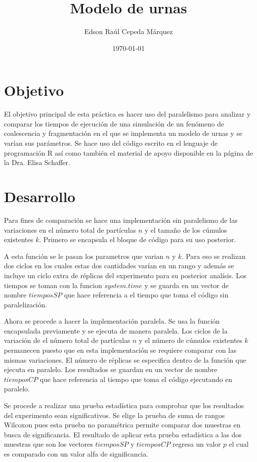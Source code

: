\documentclass{article}
\author{Edson Raúl Cepeda Márquez}
\title{Modelo de urnas}
\date{\today}
\begin{document}
\maketitle

\section{Objetivo}
El objetivo principal de esta práctica es hacer uso del paralelismo para analizar y comparar los tiempos de ejecución de una simulación de un fenómeno de coalescencia y fragmentación en el que se implementa un modelo de urnas y se varían sus parámetros. Se hace uso del código escrito en el lenguaje de programación R \cite{r} así como también el material de apoyo disponible en la página \cite{satu} de la Dra. Elisa Schaffer.

\section{Desarrollo}
Para fines de comparación se hace una implementación sin paralelismo de las variaciones en el número total de partículas $n$ y el tamaño de los cúmulos existentes $k$.
Primero se encapsula el bloque de código para su uso posterior.

A esta función se le pasan los parametros que varian $n$ y $k$.
Para eso se realizan dos ciclos en los cuales estas dos cantidades varían en un rango y además se incluye un ciclo extra de réplicas del experimento para su posterior analísis.
Los tiempos se toman con la funcion $system.time$ y se guarda en un vector de nombre $tiemposSP$ que hace referencia a el tiempo que toma el código sin paralelización.

Ahora se procede a hacer la implementación paralela.
Se usa la función encapsulada previamente y se ejecuta de manera paralela. 
Los ciclos de la variación de el número total de partículas $n$ y el número de cúmulos existentes $k$ permanecen puesto que en esta implementación se requiere comparar con las mismas variaciones.
El número de réplicas se especifica dentro de la función que ejecuta en paralelo.
Los resultados se guardan en un vector de nombre $tiemposCP$ que hace referencia al tiempo que toma el código ejecutando en paralelo.


Se procede a realizar una prueba estadística para comprobar que los resultados del experimento sean significativos.
Se elige la prueba de suma de rangos Wilcoxon  pues esta prueba no paramétrica permite comparar dos muestras en busca de significancia.
El resultado de aplicar esta prueba estadística a las dos muestras que son los vectores $tiemposSP$ y $tiemposCP$ regresa un valor $p$ el cual es comparado con un valor alfa de significancia.

\end{document}
